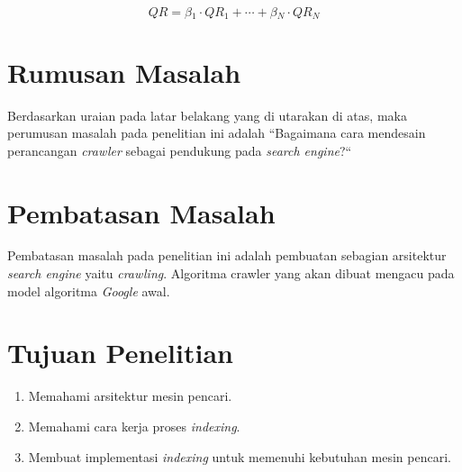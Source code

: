 \begin{equation}
	QR = \beta{}_1 \cdot{} QR_1 + \cdots{} + \beta{}_N \cdot{} QR_N
\end{equation}






\section{Rumusan Masalah}
Berdasarkan uraian pada latar belakang yang di utarakan di atas, maka perumusan
masalah pada penelitian ini adalah ``Bagaimana cara mendesain perancangan
\emph{crawler} sebagai pendukung pada \emph{search engine}?``

\section{Pembatasan Masalah}
Pembatasan masalah pada penelitian ini adalah pembuatan sebagian arsitektur
\emph{search engine} yaitu \emph{crawling}. Algoritma crawler yang akan dibuat
mengacu pada model algoritma \emph{Google} awal.

\section{Tujuan Penelitian}
\begin{enumerate}
	\item Memahami arsitektur mesin pencari.
	\item Memahami cara kerja proses \emph{indexing}.
	\item Membuat implementasi \emph{indexing} untuk memenuhi kebutuhan mesin
		pencari.
\end{enumerate}

